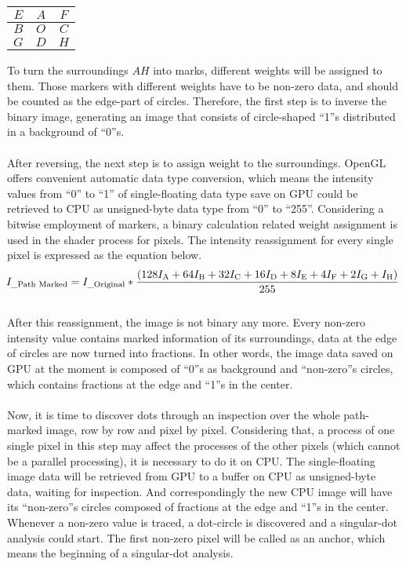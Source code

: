 \begin{center}
  \begin{tabular}{ | c | c | c | }
    \hline
    \(E\) & \(A\) & \(F\) \\ \hline
    \(B\) & \(O\) & \(C\) \\ \hline
    \(G\) & \(D\) & \(H\) \\
    \hline
  \end{tabular}
\end{center}
%
To turn the surroundings \(A\)\texttildelow \(H\) into marks, different weights will be assigned to them. Those markers with different weights have to be non-zero data, and should be counted as the edge-part of circles. Therefore, the first step is to inverse the binary image, generating an image that consists of circle-shaped \enquote{1}s distributed in a background of \enquote{0}s.%
\\\\%
After reversing, the next step is to assign weight to the surroundings. OpenGL offers convenient automatic data type conversion, which means the intensity values from \enquote{0} to \enquote{1} of single-floating data type save on GPU could be retrieved to CPU as unsigned-byte data type from \enquote{0} to \enquote{255}. Considering a bitwise employment of markers, a binary calculation related weight assignment is used in the shader process for pixels. The intensity reassignment for every single pixel is expressed as the equation below.
%
\begin{equation}
\hspace*{-0.1cm}%
%
I_{\text{\_Path Marked}} = I_{\text{\_Original}} * \frac{(128I_{\text{A}} + 64I_{\text{B}} + 32I_{\text{C}} + 16I_{\text{D}} + 8I_{\text{E}} +  4I_{\text{F}} +  2I_{\text{G}}+I_{\text{H}})}{ 255 }
%
\label{snifferDistributionWeight}
\end{equation}%
\\%
After this reassignment, the image is not binary any more. Every non-zero intensity value contains marked information of its surroundings, data at the edge of circles are now turned into fractions. In other words, the image data saved on GPU at the moment is composed of \enquote{0}s as background and \enquote{non-zero}s circles, which contains fractions at the edge and \enquote{1}s in the center.%
\\\\%
Now, it is time to discover dots through an inspection over the whole path-marked image, row by row and pixel by pixel. Considering that, a process of one single pixel in this step may affect the processes of the other pixels (which cannot be a parallel processing), it is necessary to do it on CPU. The single-floating image data will be retrieved from GPU to a buffer on CPU as unsigned-byte data, waiting for inspection. And correspondingly the new CPU image will have its \enquote{non-zero}s circles composed of fractions at the edge and \enquote{1}s in the center. Whenever a non-zero value is traced, a dot-circle is discovered and a singular-dot analysis could start. The first non-zero pixel will be called as an anchor, which means the beginning of a singular-dot analysis. %
